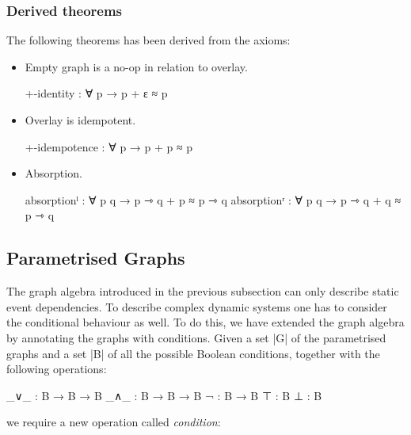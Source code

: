 \subsubsection{Derived theorems}


The following theorems has been derived from the axioms:

\begin{itemize}
\item{Empty graph is a no-op in relation to overlay.
\begin{code}
  +-identity : ∀ p → p + ε ≈ p
\end{code}}
\item{Overlay is idempotent.
\begin{code}
  +-idempotence : ∀ p → p + p ≈ p
\end{code}}
\item{Absorption.
\begin{code}
  absorptionˡ : ∀ p q → p ⇾ q + p ≈ p ⇾ q
  absorptionʳ : ∀ p q → p ⇾ q + q ≈ p ⇾ q
\end{code}}
\end{itemize}

\subsection{Parametrised Graphs}


The graph algebra introduced in the previous subsection can only describe static event dependencies.
To describe complex dynamic systems one has to consider the conditional behaviour as well.
To do this, we have extended the graph algebra by annotating the graphs with conditions.
Given a set |G| of the parametrised graphs and a set |B| of all the possible Boolean conditions, together with the following operations:

\begin{code}
  _∨_ : B → B → B
  _∧_ : B → B → B
  ¬ : B → B
  ⊤ : B
  ⊥ : B
\end{code}

we require a new operation called \emph{condition}:


